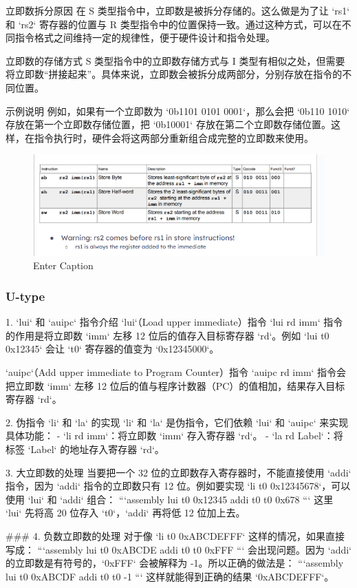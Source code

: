 \documentclass{ctexart}
\begin{document}
 立即数拆分原因
在 S 类型指令中，立即数是被拆分存储的。这么做是为了让 `rs1` 和 `rs2` 寄存器的位置与 R 类型指令中的位置保持一致。通过这种方式，可以在不同指令格式之间维持一定的规律性，便于硬件设计和指令处理。

 立即数的存储方式
S 类型指令中的立即数存储方式与 I 类型有相似之处，但需要将立即数“拼接起来”。具体来说，立即数会被拆分成两部分，分别存放在指令的不同位置。

 示例说明
例如，如果有一个立即数为 `0b1101 0101 0001`，那么会把 `0b110 1010` 存放在第一个立即数存储位置，把 `0b10001` 存放在第二个立即数存储位置。这样，在指令执行时，硬件会将这两部分重新组合成完整的立即数来使用。 
\begin{figure}
    \centering
    \includegraphics[width=0.5\linewidth]{S-type指令汇总.png}
    \caption{Enter Caption}
    \label{fig:enter-label}
\end{figure}
\subsubsection{U-type}
 1. `lui` 和 `auipc` 指令介绍
 `lui`（Load upper immediate）指令
`lui rd imm` 指令的作用是将立即数 `imm` 左移 12 位后的值存入目标寄存器 `rd`。例如 `lui t0 0x12345` 会让 `t0` 寄存器的值变为 `0x12345000`。

 `auipc`（Add upper immediate to Program Counter）指令
`auipc rd imm` 指令会把立即数 `imm` 左移 12 位后的值与程序计数器（PC）的值相加，结果存入目标寄存器 `rd`。

 2. 伪指令 `li` 和 `la` 的实现
`li` 和 `la` 是伪指令，它们依赖 `lui` 和 `auipc` 来实现具体功能：
 - `li rd imm`：将立即数 `imm` 存入寄存器 `rd`。
 - `la rd Label`：将标签 `Label` 的地址存入寄存器 `rd`。

 3. 大立即数的处理
当要把一个 32 位的立即数存入寄存器时，不能直接使用 `addi` 指令，因为 `addi` 指令的立即数只有 12 位。例如要实现 `li t0 0x12345678`，可以使用 `lui` 和 `addi` 组合：
```assembly
lui t0 0x12345
addi t0 t0 0x678
```
这里 `lui` 先将高 20 位存入 `t0`，`addi` 再将低 12 位加上去。

### 4. 负数立即数的处理
对于像 `li t0 0xABCDEFFF` 这样的情况，如果直接写成：
```assembly
lui t0 0xABCDE
addi t0 t0 0xFFF
```
会出现问题。因为 `addi` 的立即数是有符号的，`0xFFF` 会被解释为 -1。所以正确的做法是：
```assembly
lui t0 0xABCDF
addi t0 t0 -1
```
这样就能得到正确的结果 `0xABCDEFFF`。
\end{document}
